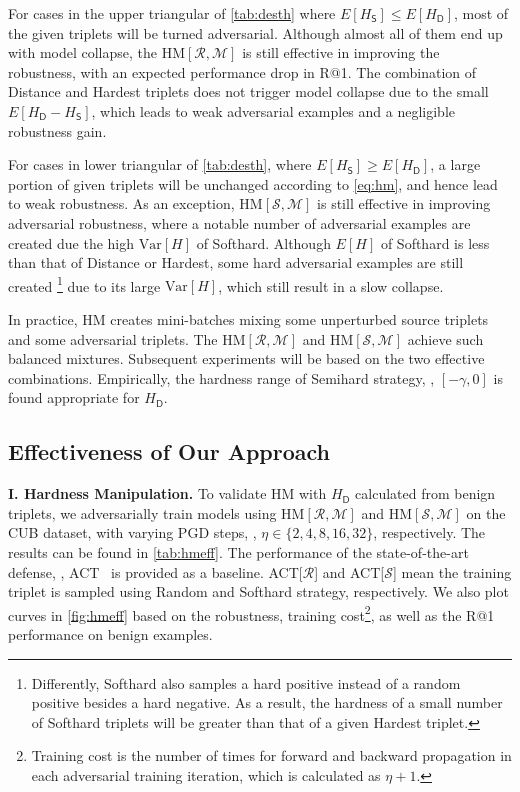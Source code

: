 \documentclass[10pt,twocolumn,letterpaper]{article}
\begin{document}
For cases in the upper triangular of \cref{tab:desth} where $E[H_\mathsf{S}]
\leqslant E[H_\mathsf{D}]$, most of the given triplets will be turned
adversarial.
%
Although almost all of them end up with model collapse, the
$\text{HM}[\mathcal{R},\mathcal{M}]$ is still effective in improving the
robustness, with an expected performance drop in R@1.
%
The combination of Distance and Hardest triplets does not trigger model
collapse due to the small $E[H_\mathsf{D}-H_\mathsf{S}]$, which leads to weak
adversarial examples and a negligible robustness gain.

For cases in lower triangular of \cref{tab:desth}, where $E[H_\mathsf{S}]
\geqslant E[H_\mathsf{D}]$, a large portion of given triplets will be unchanged
according to \cref{eq:hm}, and hence lead to weak robustness.
%
As an exception, $\text{HM}[\mathcal{S},\mathcal{M}]$ is still effective in
improving adversarial robustness, where a notable number of adversarial
examples are created due the high $\text{Var}[H]$ of Softhard.
%
Although $E[H]$ of Softhard is less than that of Distance or Hardest, some hard
adversarial examples are still created%
%
\footnote{Differently, Softhard also samples a
hard positive instead of a random positive besides a hard negative.
%
As a result, the hardness of a small number of Softhard triplets will be 
greater than that of a given Hardest triplet.}
%
due to its large $\text{Var}[H]$, which
still result in a slow collapse.


In practice, HM creates mini-batches mixing some unperturbed source triplets and
some adversarial triplets.
%
The $\text{HM}[\mathcal{R}, \mathcal{M}]$ and $\text{HM}[\mathcal{S},
\mathcal{M}]$ achieve such balanced mixtures.
%
Subsequent experiments will be based on the two effective combinations.
%
Empirically, the hardness range of Semihard strategy,
\ie, $[-\gamma,0]$ is found appropriate for $H_\mathsf{D}$.

\subsection{Effectiveness of Our Approach}
\label{sec:42}



\noindent\textbf{I. Hardness Manipulation.}
%
To validate HM with $H_\mathsf{D}$ calculated from benign
triplets, we adversarially train models using $\text{HM}[\mathcal{R},
\mathcal{M}]$ and $\text{HM}[\mathcal{S}, \mathcal{M}]$ on the CUB dataset,
with varying PGD steps, \ie, $\eta\in\{2,4,8,16,32\}$, respectively.
%
The results can be found in \cref{tab:hmeff}.
%
The performance of the state-of-the-art defense, \ie, ACT~\cite{robrank} is
provided as a baseline.
%
ACT[$\mathcal{R}$] and ACT[$\mathcal{S}$] mean the training triplet is sampled
using Random and Softhard strategy, respectively.
%
We also plot curves in \cref{fig:hmeff} based on the robustness, training
cost\footnote{Training cost is the number of times for forward and backward
propagation in each adversarial training iteration, which is calculated as
$\eta+1$.}, as well as the R@1 performance on benign examples.
\end{document}

